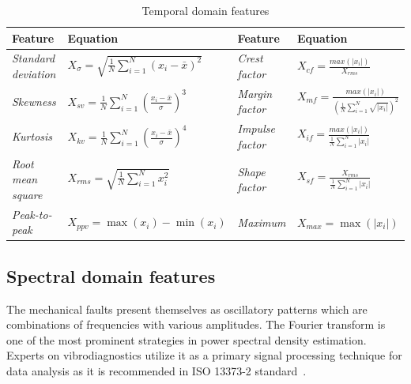 \begin{table}[h]
\centering
\renewcommand{\arraystretch}{2}
\begin{adjustbox}{width=\columnwidth,center}
\begin{tabular}{|l|l|l|l|}
\hline
\textbf{Feature}            & \textbf{Equation}                                                                    & \textbf{Feature}        & \textbf{Equation}                                                                                                  \\ \hline
\textit{Standard deviation} & $ X_\sigma = \sqrt{\frac{1}{N}\sum_{i = 1}^{N}{\left(x_i - \bar{x}\right)^2}} $        & \textit{Crest factor}   & $ X_{cf} = \frac{max(|x_i|)}{X_{rms}} $                       \\ \hline
\textit{Skewness}           & $ X_{sv} = \frac{1}{N}\sum_{i = 1}^{N}{\left(\frac{x_i - \bar{x}}{\sigma}\right)^3}$ & \textit{Margin factor}  & $ X_{mf} = \frac{max(|x_i|)}{\left( \frac{1}{N} \sum_{i=1}^{N}{\sqrt{|x_i|}} \right)^2} $                          \\ \hline
\textit{Kurtosis}           & $ X_{kv} = \frac{1}{N}\sum_{i = 1}^{N}{\left(\frac{x_i - \bar{x}}{\sigma}\right)^4}$ & \textit{Impulse factor} & $ X_{if} = \frac{max(|x_i|)}{\frac{1}{N} \sum_{i=1}^{N}{|x_i|}} $                                                  \\ \hline
\textit{Root mean square}   & $ X_{rms} = \sqrt{\frac{1}{N}\sum_{i = 1}^{N}{x_i^2}} $             & \textit{Shape factor}   & $ X_{sf} = \frac{X_{rms}}{\frac{1}{N} \sum_{i=1}^{N}{|x_i|}}$ \\ \hline
\textit{Peak-to-peak}       & $ X_{ppv} = \max(x_i) - \min(x_i) $                                                  & \textit{Maximum}        & $ X_{max} = \max(|x_i|) $                                                                                          \\ \hline
\end{tabular}
\end{adjustbox}
\caption{Temporal domain features}
\label{tab:td-features}
\end{table}

\subsection{Spectral domain features}
The mechanical faults present themselves as oscillatory patterns which are combinations of frequencies with various amplitudes. The Fourier transform is one of the most prominent strategies in power spectral density estimation. Experts on vibrodiagnostics utilize it as a primary signal processing technique for data analysis as it is recommended in ISO 13373-2 standard~\cite{noauthor_iso_2016_2}. 


